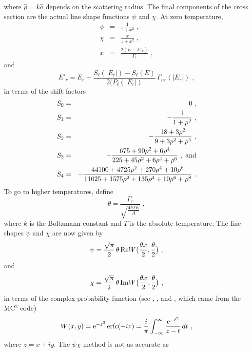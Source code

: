 where $\hat\rho{=}k\hat a$ depends on the scattering radius.  The
final components of the cross section are the actual line shape
functions $\psi$ and $\chi$.  At zero temperature,
\begin{eqnarray}
  \psi&=&{\frac{1}{1+x^2}}\,\,,\\
  \chi&=&{\frac{x}{1+x^2}}\,\,,\\
  x&=&{\frac{2(E-E'_r)}{\Gamma_r}}\,\,,
\end{eqnarray}
and
\begin{equation}
   E'_r=E_r+{\frac{S_\ell(|E_r|)-S_\ell(E)}
    {2(P_\ell(|E_r|)}}\,\Gamma_{nr}(|E_r|)\,\,,
\label{r24}
\end{equation}
in terms of the shift factors
\begin{eqnarray}
  S_0&=&0\,\,,\\
  S_1&=&-{\frac{1}{1+\rho^2}}\,\,,\\
  S_2&=&-{\frac{18+3\rho^2}{9+3\rho^2+\rho^4}} \,\,,\\
  S_3&=&-{\frac{675+90\rho^2+6\rho^4}{225+45\rho^2+6\rho^4+\rho^6}}\,\,,
         \;\hbox{and}\\
  S_4&=&-{\frac{44100+4725\rho^2+270\rho^4+10\rho^6}
           {11025+1575\rho^2+135\rho^4+10\rho^6+\rho^8}}\,\,.
\end{eqnarray}
To go to higher temperatures, define
\begin{equation}
   \theta={\frac{\Gamma_r}
    {\displaystyle\sqrt{{\frac{4kTE}{A}}}}}\,\,,
\end{equation}
where $k$ is the Boltzmann constant
and $T$ is the absolute temperature.
The line shapes $\psi$ and $\chi$ are now given by
\begin{equation}
   \psi={\frac{\sqrt{\pi}}{2}}\,\theta \,{\rm Re} W\bigl(
    {\frac{\theta x}{2}},{{\theta}\over 2}\bigr)\,\,,
\end{equation}
and
\begin{equation}
   \chi={{\sqrt{\pi}}\over 2} \,\theta \,{\rm Im}W\bigl(
    {{\theta x}\over 2},{{\theta}\over 2}\bigr)\,\,,
\end{equation}
in terms of the complex probability function (see ,
, and , which came from the MC$^2$ code\cite{MC2})
\begin{equation}
   W(x,y)={\rm e}^{-z^2}\,{\rm erfc}(-iz)
    ={\frac{i}{\pi}}\int_{-\infty}^\infty
    {{{\rm e}^{-t^2}}\over{z-t}}\,dt\,\,,
\end{equation}
where $z{=}x{+}iy$.  The $\psi\chi$ method is not as accurate as
